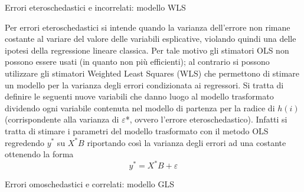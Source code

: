 \documentclass[a4page, 11pt]{article} %
\begin{document}
\begin{itshape}
Errori eteroschedastici e incorrelati: modello WLS
\end{itshape}%

Per errori eteroschedastici si intende quando la varianza dell’errore non rimane costante al variare del valore delle variabili esplicative, violando quindi una delle ipotesi della regressione lineare classica. Per tale motivo gli stimatori OLS non possono essere usati (in quanto non più efficienti); al contrario si possono utilizzare gli stimatori Weighted Least Squares (WLS) che permettono di stimare un modello per la varianza degli errori condizionata ai regressori. 
Si tratta di definire le seguenti nuove variabili che danno luogo al modello trasformato dividendo ogni variabile contenuta nel modello di partenza per la radice di $h(i)$ (corrispondente alla varianza di $\varepsilon$*, ovvero l'errore eteroschedastico). 
Infatti si tratta di stimare i parametri del modello trasformato con il metodo OLS regredendo $y^*$ su $X^*B$ riportando così la varianza degli errori ad una costante ottenendo la forma 
\[
y^* = X^*B + \varepsilon
\]
\begin{itshape}
Errori omoschedastici e correlati: modello GLS
\end{itshape}
\end{document}
